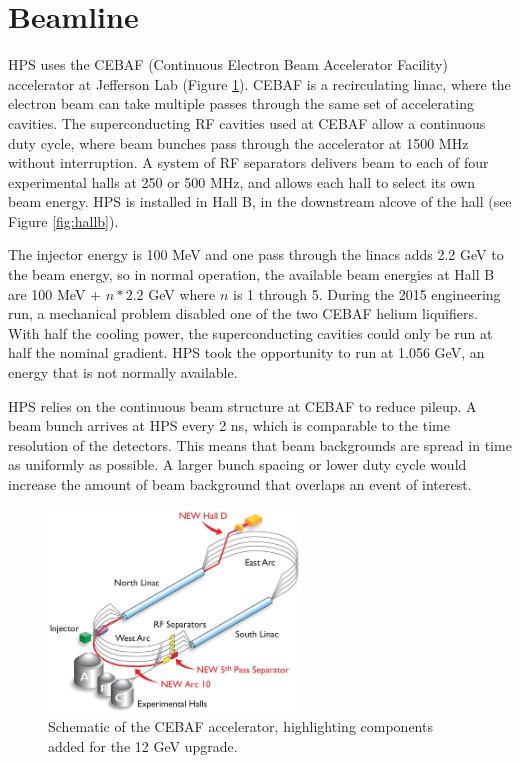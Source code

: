 \section{Beamline}

HPS uses the CEBAF (Continuous Electron Beam Accelerator Facility) accelerator at Jefferson Lab (Figure \ref{fig:cebaf}).
CEBAF is a recirculating linac, where the electron beam can take multiple passes through the same set of accelerating cavities.
The superconducting RF cavities used at CEBAF allow a continuous duty cycle, where beam bunches pass through the accelerator at 1500 MHz without interruption.
A system of RF separators delivers beam to each of four experimental halls at 250 or 500 MHz, and allows each hall to select its own beam energy.
HPS is installed in Hall B, in the downstream alcove of the hall (see Figure \ref{fig:hallb}).

The injector energy is 100 MeV and one pass through the linacs adds 2.2 GeV to the beam energy, so in normal operation, the available beam energies at Hall B are 100 MeV + $n*2.2$ GeV where $n$ is 1 through 5.
During the 2015 engineering run, a mechanical problem disabled one of the two CEBAF helium liquifiers.
With half the cooling power, the superconducting cavities could only be run at half the nominal gradient.
HPS took the opportunity to run at 1.056 GeV, an energy that is not normally available.

HPS relies on the continuous beam structure at CEBAF to reduce pileup.
A beam bunch arrives at HPS every 2 ns, which is comparable to the time resolution of the detectors.
This means that beam backgrounds are spread in time as uniformly as possible.
A larger bunch spacing or lower duty cycle would increase the amount of beam background that overlaps an event of interest.


\begin{figure}[ht]
    \includegraphics[width=0.6\textwidth]{detector/figs/cebaf}
    \caption{Schematic of the CEBAF accelerator, highlighting components added for the 12 GeV upgrade.}
    \label{fig:cebaf}
\end{figure}

